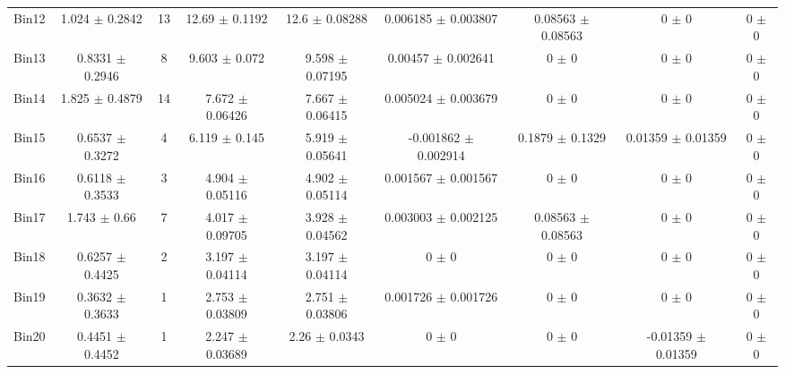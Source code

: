 \begin{tabular}{@{\extracolsep{4pt}}lcccccccc@{}}
     Bin12 & 1.024 $\pm$ 0.2842 & 13 & 12.69 $\pm$ 0.1192 & 12.6 $\pm$ 0.08288 & 0.006185 $\pm$ 0.003807 & 0.08563 $\pm$ 0.08563 & 0 $\pm$ 0 & 0 $\pm$ 0 \\ 
     Bin13 & 0.8331 $\pm$ 0.2946 & 8 & 9.603 $\pm$ 0.072 & 9.598 $\pm$ 0.07195 & 0.00457 $\pm$ 0.002641 & 0 $\pm$ 0 & 0 $\pm$ 0 & 0 $\pm$ 0 \\ 
     Bin14 & 1.825 $\pm$ 0.4879 & 14 & 7.672 $\pm$ 0.06426 & 7.667 $\pm$ 0.06415 & 0.005024 $\pm$ 0.003679 & 0 $\pm$ 0 & 0 $\pm$ 0 & 0 $\pm$ 0 \\ 
     Bin15 & 0.6537 $\pm$ 0.3272 & 4 & 6.119 $\pm$ 0.145 & 5.919 $\pm$ 0.05641 & -0.001862 $\pm$ 0.002914 & 0.1879 $\pm$ 0.1329 & 0.01359 $\pm$ 0.01359 & 0 $\pm$ 0 \\ 
     Bin16 & 0.6118 $\pm$ 0.3533 & 3 & 4.904 $\pm$ 0.05116 & 4.902 $\pm$ 0.05114 & 0.001567 $\pm$ 0.001567 & 0 $\pm$ 0 & 0 $\pm$ 0 & 0 $\pm$ 0 \\ 
     Bin17 & 1.743 $\pm$ 0.66 & 7 & 4.017 $\pm$ 0.09705 & 3.928 $\pm$ 0.04562 & 0.003003 $\pm$ 0.002125 & 0.08563 $\pm$ 0.08563 & 0 $\pm$ 0 & 0 $\pm$ 0 \\ 
     Bin18 & 0.6257 $\pm$ 0.4425 & 2 & 3.197 $\pm$ 0.04114 & 3.197 $\pm$ 0.04114 & 0 $\pm$ 0 & 0 $\pm$ 0 & 0 $\pm$ 0 & 0 $\pm$ 0 \\ 
     Bin19 & 0.3632 $\pm$ 0.3633 & 1 & 2.753 $\pm$ 0.03809 & 2.751 $\pm$ 0.03806 & 0.001726 $\pm$ 0.001726 & 0 $\pm$ 0 & 0 $\pm$ 0 & 0 $\pm$ 0 \\ 
     Bin20 & 0.4451 $\pm$ 0.4452 & 1 & 2.247 $\pm$ 0.03689 & 2.26 $\pm$ 0.0343 & 0 $\pm$ 0 & 0 $\pm$ 0 & -0.01359 $\pm$ 0.01359 & 0 $\pm$ 0 \\ 
\hline\hline
  \end{tabular}
